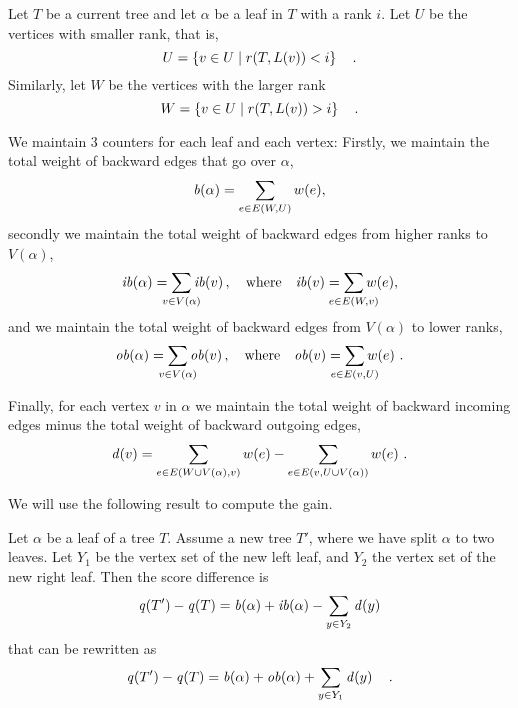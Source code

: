 Let $T$ be a current tree and let $\alpha$ be a leaf in $T$ with a rank $i$.
Let $U$ be the vertices with smaller rank, that is,
\[
	U = \left\{v \in U \mid r(T, L(v)) < i\right\}\quad.
\]
Similarly, let $W$ be the vertices with the larger rank
\[
	W = \left\{v \in U \mid r(T, L(v)) > i\right\}\quad.
\]

We maintain 3 counters for each leaf and each vertex: Firstly, we maintain the total weight of backward
edges that go over $\alpha$,
\begin{equation}
	\back{\alpha} = \sum_{e \in E(W, U)} w(e),
	\label{eq:count1}
\end{equation}
secondly we maintain the total weight of backward edges from higher ranks to $V(\alpha)$,
\begin{equation}
	\inback{\alpha} = \sum_{\mathclap{v \in V(\alpha)}}\inback{v}, \quad \text{where}\quad  \inback{v} = \sum_{\mathclap{e \in E(W, v)}} w(e),
	\label{eq:count2}
\end{equation}
and we maintain the total weight of backward edges from $V(\alpha)$ to lower ranks,
\begin{equation}
	\outback{\alpha} = \sum_{\mathclap{v \in V(\alpha)}}\outback{v}, \quad \text{where}\quad  \outback{v} = \sum_{\mathclap{e \in E(v, U)}} w(e)\ .
	\label{eq:count3}
\end{equation}

Finally, for each vertex $v$ in $\alpha$ we maintain the total weight of backward incoming edges
minus the total weight of backward outgoing edges,
\begin{equation}
	\diff{v} = \sum_{e \in E(W \cup V(\alpha), v)} w(e) - \sum_{e \in E(v, U \cup V(\alpha))} w(e)\ .
	\label{eq:count4}
\end{equation}

We will use the following result to compute the gain.


\begin{proposition}
\label{prop:split}
Let $\alpha$ be a leaf of a tree $T$. 
Assume a new tree $T'$, where we have split $\alpha$ to two leaves. Let $Y_1$ be the
vertex set of the new left leaf, and $Y_2$ the vertex set of the new right leaf. Then
the score difference is
\begin{equation}
\label{eq:gain1}
	\score{T'} - \score{T} = \back{\alpha} + \inback{\alpha} - \sum_{y \in Y_2} \diff{y} 
\end{equation}
that can be rewritten as
\begin{equation}
\label{eq:gain2}
	\score{T'} - \score{T} = \back{\alpha} + \outback{\alpha} + \sum_{y \in Y_1} \diff{y}\quad. 
\end{equation}
\end{proposition}

